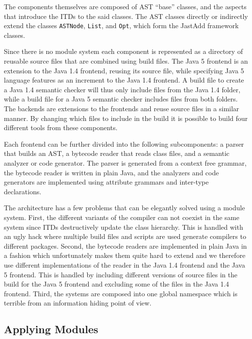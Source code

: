 The components themselves are composed of AST "`base"' classes, and the
aspects that introduce the ITDs to the said classes. The AST classes
directly or indirectly extend the classes \texttt{ASTNode}, \texttt{List}, and \texttt{Opt},
which form the JastAdd framework classes. 

Since there is no module system each component is represented as a
directory of reusable source files that are combined using build files. The
Java 5 frontend is an extension to the Java 1.4 frontend, reusing its
source file, while specifying Java 5 language features as an increment to
the Java 1.4 frontend. A build file to create a Java 1.4 semantic checker
will thus only include files from the Java 1.4 folder, while a build file
for a Java 5 semantic checker includes files from both folders. The
backends are extensions to the frontends and reuse source files in a
similar manner.  By changing which files to include in the build it is
possible to build four different tools from these components.

Each frontend can be further divided into the following subcomponents: a
parser that builds an AST, a bytecode reader that reads class files, and a
semantic analyzer or code generator. The parser is generated from a context
free grammar, the bytecode reader is written in plain Java, and the
analyzers and code generators are implemented using attribute grammars and
inter-type declarations.

The architecture has a few problems that can be elegantly solved using a
module system. First, the different variants of the compiler can not
coexist in the same system since ITDs destructively update the class
hierarchy. This is handled with an ugly hack where multiple build files and
scripts are used generate compilers to different packages.  Second, the
bytecode readers are implemented in plain Java in a fashion which
unfortunately makes them quite hard to extend and we therefore use
different implementations of the reader in the Java 1.4 frontend and the
Java 5 frontend. This is handled by including different versions of source
files in the build for the Java 5 frontend and excluding some of the files
in the Java 1.4 frontend. Third, the systems are composed into one global
namespace which is terrible from an information hiding point of view.

\subsection{Applying Modules}

